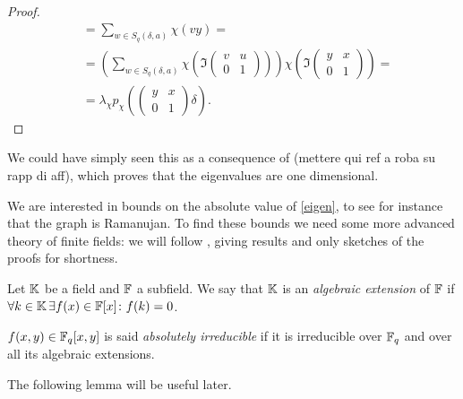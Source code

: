 \begin{prop}
\begin{proof}
\begin{align*}
	 &=\sum_{w \in S_q(\delta,a)}\chi (vy)=\\
	 &=(\sum_{w \in S_q(\delta,a)}\chi (\Im \begin{pmatrix} v & u \\ 0 & 1 \end{pmatrix}))\chi (\Im  \begin{pmatrix} y & x \\ 0 & 1 \end{pmatrix})=\\
	 &=\lambda_{\chi} p_{\chi} (\begin{pmatrix} y & x \\ 0 & 1 \end{pmatrix} \delta).
\end{align*}
\end{proof}
\end{prop}We could have simply seen this as a consequence of (mettere qui ref a roba su rapp di aff), which proves that the eigenvalues are one dimensional.

We are interested in bounds on the absolute value of \ref{eigen}, to see for instance that the graph is Ramanujan. 
To find these bounds we need some more advanced theory of finite fields: we will follow \cite{schmidt1976equations},
giving results and only sketches of the proofs for shortness.
\begin{defn}
Let ${\mathbb K}$ be a field and ${\mathbb F}$ a subfield. We say that ${\mathbb K}$ is an \emph{algebraic extension} of ${\mathbb F}$ if
$\forall k \in {\mathbb K} \, \exists f(x) \in {\mathbb F}[x] \colon f(k)=0$.
\end{defn}
\begin{defn}
$f(x,y)\in {\mathbb F}_q[x,y]$ is said \emph{absolutely irreducible} if it is irreducible over ${\mathbb F}_q$ and over all its algebraic extensions.
\end{defn}
The following lemma will be useful later.

